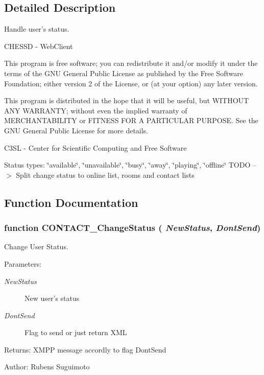 \subsection{Detailed Description}
Handle user's status. 

CHESSD - WebClient

This program is free software; you can redistribute it and/or modify it under the terms of the GNU General Public License as published by the Free Software Foundation; either version 2 of the License, or (at your option) any later version.

This program is distributed in the hope that it will be useful, but WITHOUT ANY WARRANTY; without even the implied warranty of MERCHANTABILITY or FITNESS FOR A PARTICULAR PURPOSE. See the GNU General Public License for more details.

C3SL - Center for Scientific Computing and Free Software

Status types: \char`\"{}available\char`\"{}, \char`\"{}unavailable\char`\"{}, \char`\"{}busy\char`\"{}, \char`\"{}away\char`\"{}, \char`\"{}playing\char`\"{}, \char`\"{}offline\char`\"{} TODO --$>$ Split change status to online list, rooms and contact lists 

\subsection{Function Documentation}
\subsubsection[CONTACT\_\-ChangeStatus]{\setlength{\rightskip}{0pt plus 5cm}function CONTACT\_\-ChangeStatus ( {\em NewStatus}, \/   {\em DontSend})}\label{status_8js_ea8c452eb196eeb0b9c7f04882827870}


Change User Status. 

\begin{Desc}
\item[Parameters:]
\begin{description}
\item[{\em NewStatus}]New user's status \item[{\em DontSend}]Flag to send or just return XML \end{description}
\end{Desc}
\begin{Desc}
\item[Returns:]XMPP message accordly to flag DontSend \end{Desc}
\begin{Desc}
\item[Author:]Rubens Suguimoto \end{Desc}


